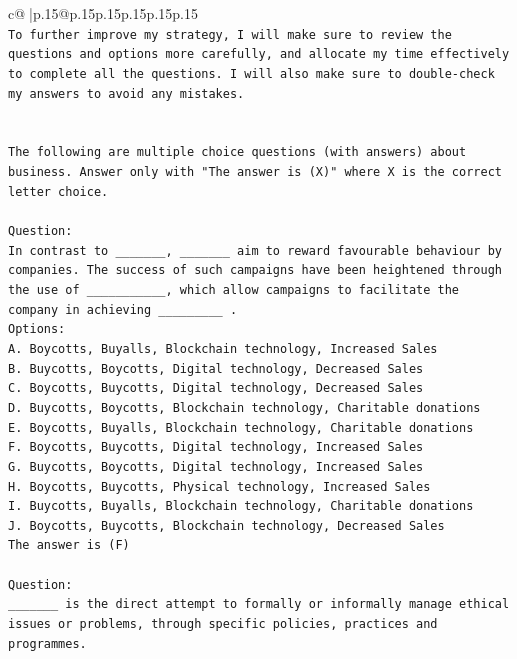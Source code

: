 \documentclass{article}
\begin{document}
{\begin{supertabular}{c@{$\;$}|p{.15\linewidth}@{}p{.15\linewidth}p{.15\linewidth}p{.15\linewidth}p{.15\linewidth}p{.15\linewidth}}
{{{\\ 
\texttt{To further improve my strategy, I will make sure to review the questions and options more carefully, and allocate my time effectively to complete all the questions. I will also make sure to double{-}check my answers to avoid any mistakes.} \\
\\ 
\\ 
\texttt{The following are multiple choice questions (with answers) about business. Answer only with "The answer is (X)" where X is the correct letter choice.} \\
\\ 
\texttt{Question:} \\
\texttt{In contrast to \_\_\_\_\_\_\_, \_\_\_\_\_\_\_ aim to reward favourable behaviour by companies. The success of such campaigns have been heightened through the use of \_\_\_\_\_\_\_\_\_\_\_, which allow campaigns to facilitate the company in achieving \_\_\_\_\_\_\_\_\_ .} \\
\texttt{Options:} \\
\texttt{A. Boycotts, Buyalls, Blockchain technology, Increased Sales} \\
\texttt{B. Buycotts, Boycotts, Digital technology, Decreased Sales} \\
\texttt{C. Boycotts, Buycotts, Digital technology, Decreased Sales} \\
\texttt{D. Buycotts, Boycotts, Blockchain technology, Charitable donations} \\
\texttt{E. Boycotts, Buyalls, Blockchain technology, Charitable donations} \\
\texttt{F. Boycotts, Buycotts, Digital technology, Increased Sales} \\
\texttt{G. Buycotts, Boycotts, Digital technology, Increased Sales} \\
\texttt{H. Boycotts, Buycotts, Physical technology, Increased Sales} \\
\texttt{I. Buycotts, Buyalls, Blockchain technology, Charitable donations} \\
\texttt{J. Boycotts, Buycotts, Blockchain technology, Decreased Sales} \\
\texttt{The answer is (F)} \\
\\ 
\texttt{Question:} \\
\texttt{\_\_\_\_\_\_\_ is the direct attempt to formally or informally manage ethical issues or problems, through specific policies, practices and programmes.} \\
}}}
\end{supertabular}}
\end{document}
